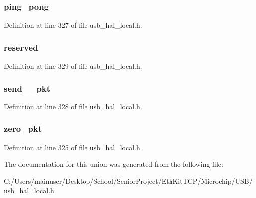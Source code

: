 \subsubsection[{ping\+\_\+pong}]{ ping\+\_\+pong}\label{union_p_i_p_e___f_l_a_g_s_a90625cae626baec3b0e8256b52dcc254}


Definition at line 327 of file usb\+\_\+hal\+\_\+local.\+h.

\hypertarget{union_p_i_p_e___f_l_a_g_s_a32acc012851fc2bad318c8a2e590bc75}{}
\subsubsection[{reserved}]{ reserved}\label{union_p_i_p_e___f_l_a_g_s_a32acc012851fc2bad318c8a2e590bc75}


Definition at line 329 of file usb\+\_\+hal\+\_\+local.\+h.

\hypertarget{union_p_i_p_e___f_l_a_g_s_a37adb8ddf2e6e38a0793f81ec8c1c1ed}{}
\subsubsection[{send\+\_\+0\+\_\+pkt}]{ send\+\_\+\_\+pkt}\label{union_p_i_p_e___f_l_a_g_s_a37adb8ddf2e6e38a0793f81ec8c1c1ed}


Definition at line 328 of file usb\+\_\+hal\+\_\+local.\+h.

\hypertarget{union_p_i_p_e___f_l_a_g_s_a9e4e83aa407fb630212de02d83d6057c}{}
\subsubsection[{zero\+\_\+pkt}]{ zero\+\_\+pkt}\label{union_p_i_p_e___f_l_a_g_s_a9e4e83aa407fb630212de02d83d6057c}


Definition at line 325 of file usb\+\_\+hal\+\_\+local.\+h.



The documentation for this union was generated from the following file\+:\begin{DoxyCompactItemize}
\item 
C\+:/\+Users/mainuser/\+Desktop/\+School/\+Senior\+Project/\+Eth\+Kit\+T\+C\+P/\+Microchip/\+U\+S\+B/\hyperlink{usb__hal__local_8h}{usb\+\_\+hal\+\_\+local.\+h}\end{DoxyCompactItemize}
